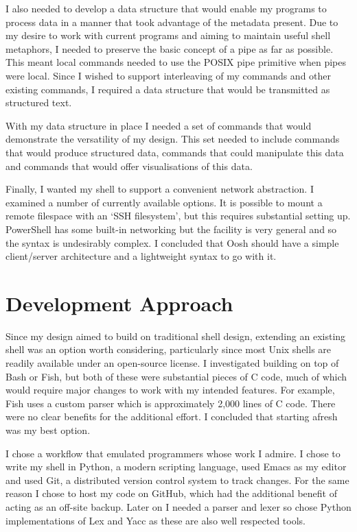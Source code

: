 \documentclass[12pt,twoside,notitlepage]{report}
\begin{document}
I also needed to develop a data structure that would enable my
programs to process data in a manner that took advantage of the
metadata present. Due to my desire to work with current programs and
aiming to maintain useful shell metaphors, I needed to preserve the
basic concept of a pipe as far as possible. This meant local commands
needed to use the POSIX pipe primitive when pipes were local. Since I
wished to support interleaving of my commands and other existing
commands, I required a data structure that would be transmitted as
structured text.

With my data structure in place I needed a set of commands that would
demonstrate the versatility of my design. This set needed to include
commands that would produce structured data, commands that could
manipulate this data and commands that would offer visualisations of
this data.

Finally, I wanted my shell to support a convenient network
abstraction. I examined a number of currently available options. It is
possible to mount a remote filespace with an `SSH filesystem', but
this requires substantial setting up. PowerShell has some built-in
networking but the facility is very general and so the syntax is
undesirably complex. I concluded that Oosh should have a simple
client/server architecture and a lightweight syntax to go with it.

\section{Development Approach}
Since my design aimed to build on traditional shell design, extending
an existing shell was an option worth considering, particularly since
most Unix shells are readily available under an open-source license. I
investigated building on top of Bash or Fish, but both of these were
substantial pieces of C code, much of which would require major
changes to work with my intended features. For example, Fish uses a
custom parser which is approximately 2,000 lines of C code. There were
no clear benefits for the additional effort. I concluded that
starting afresh was my best option.

I chose a workflow that emulated programmers whose work I admire. I
chose to write my shell in Python, a modern scripting language, used
Emacs as my editor and used Git, a distributed version control system
to track changes. For the same reason I chose to host my code on GitHub,
which had the additional benefit of acting as an off-site
backup. Later on I needed a parser and lexer so chose Python
implementations of Lex and Yacc as these are also well respected tools.
\end{document}
